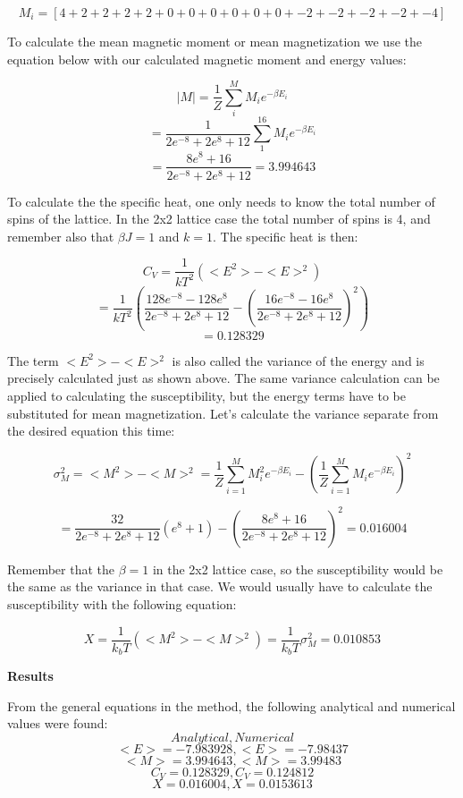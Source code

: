\documentclass[10pt,a4paper]{article}
\begin{document}
$$
M_i = [4 + 2 + 2 + 2 + 2 + 0 + 0 + 0 + 0 + 0 + 0 + -2 + -2 + -2 + -2 + -4]
$$

\noindent To calculate the mean magnetic moment or mean magnetization we use the equation below with our calculated magnetic moment and energy values:

$$
|M| = \frac{1}{Z}\sum^{M}_{i}M_ie^{-\beta E_i}
$$
$$
 = \frac{1}{2e^{-8} + 2e^8 + 12}\sum^{16}_{1}M_ie^{-\beta E_i}
$$
$$
 = \frac{8e^{8} + 16}{2e^{-8} + 2e^8 + 12} = 3.994643
$$



\noindent To calculate the the specific heat, one only needs to know the total number of spins of the lattice. In the 2x2 lattice case the total number of spins is 4, and remember also that $\beta J = 1$ and $k = 1$. The specific heat is then:

$$
C_V = \frac{1}{kT^2}(<E^2> - <E>^2)
$$
$$
 = \frac{1}{kT^2}(\frac{128e^{-8} - 128e^8}{2e^{-8} + 2e^8 + 12} - (\frac{16e^{-8} - 16e^8}{2e^{-8} + 2e^8 + 12})^2)
$$
$$
 = 0.128329
$$

\noindent The term $<E^2> - <E>^2$ is also called the variance of the energy and is precisely calculated just as shown above. The same variance calculation can be applied to calculating the susceptibility, but the energy terms have to be substituted for mean magnetization.
Let's calculate the variance separate from the desired equation this time:

$$
\sigma_M^2 = <M^2>-<M>^2 = \frac{1}{Z}\sum^{M}_{i = 1}M_i^2 e^{-\beta E_i} - (\frac{1}{Z}\sum^{M}_{i = 1}M_i e^{-\beta E_i})^2
$$

$$
 = \frac{32}{2e^{-8} + 2e^8 + 12}(e^{8}+1) - (\frac{8e^8 + 16}{2e^{-8} + 2e^8 + 12})^2 = 0.016004
$$

\noindent Remember that the $\beta = 1$ in the 2x2 lattice case, so the susceptibility would be the same as the variance in that case. We would usually have to calculate the susceptibility with the following equation:

$$
X = \frac{1}{k_bT}(<M^2> - <M>^2) = \frac{1}{k_bT}\sigma_M^2 = 0.010853
$$

\newpage

\begin{center}
{\LARGE\bf Results}
\end{center}

From the general equations in the method, the following analytical and numerical values were found:
$$
Analytical ,Numerical
$$
$$
<E> = -7.983928 , <E> = -7.98437
$$
$$
<M> = 3.994643 , <M> = 3.99483
$$
$$
C_V = 0.128329 , C_V = 0.124812
$$
$$
X = 0.016004 , X = 0.0153613
$$
\end{document}
